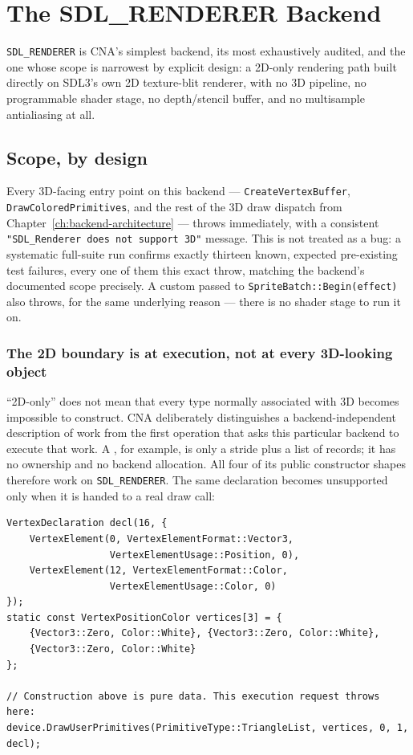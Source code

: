 \chapter{The SDL\_RENDERER Backend}
\label{ch:sdl-renderer}

\texttt{SDL\_RENDERER} is CNA's simplest backend, its most exhaustively audited, and the one
whose scope is narrowest by explicit design: a 2D-only rendering path built directly on
SDL3's own 2D texture-blit renderer, with no 3D pipeline, no programmable shader stage, no
depth/stencil buffer, and no multisample antialiasing at all.

\section{Scope, by design}

Every 3D-facing entry point on this backend --- \texttt{CreateVertexBuffer},
\texttt{DrawColoredPrimitives}, and the rest of the 3D draw dispatch from
Chapter~\ref{ch:backend-architecture} --- throws immediately, with a consistent
\texttt{"SDL\_Renderer does not support 3D"} message. This is not treated as a bug: a
systematic full-suite run confirms exactly thirteen known, expected pre-existing test
failures, every one of them this exact throw, matching the backend's documented scope
precisely. A custom  passed to \texttt{SpriteBatch::Begin(effect)} also
throws, for the same underlying reason --- there is no shader stage to run it on.

\subsection{The 2D boundary is at execution, not at every 3D-looking object}

``2D-only'' does not mean that every type normally associated with 3D becomes impossible to
construct.  CNA deliberately distinguishes a backend-independent description of work from
the first operation that asks this particular backend to execute that work.  A
, for example, is only a stride plus a list of
 records; it has no  ownership and no
backend allocation.  All four of its public constructor shapes therefore work on
\texttt{SDL\_RENDERER}.  The same declaration becomes unsupported only when it is handed to a
real draw call:

\begin{lstlisting}
VertexDeclaration decl(16, {
    VertexElement(0, VertexElementFormat::Vector3,
                  VertexElementUsage::Position, 0),
    VertexElement(12, VertexElementFormat::Color,
                  VertexElementUsage::Color, 0)
});
static const VertexPositionColor vertices[3] = {
    {Vector3::Zero, Color::White}, {Vector3::Zero, Color::White},
    {Vector3::Zero, Color::White}
};

// Construction above is pure data. This execution request throws here:
device.DrawUserPrimitives(PrimitiveType::TriangleList, vertices, 0, 1, decl);
\end{lstlisting}

